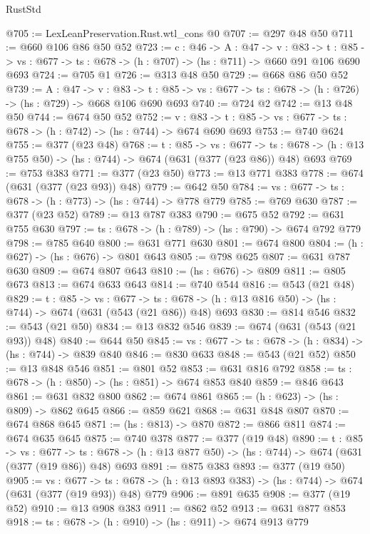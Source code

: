 \begin{lexlean}{RustStd}
\begin{coremodule}
@705 := LexLeanPreservation.Rust.wtl_cons @0
@707 := @297 @48 @50
@711 := @660 @106 @86 @50 @52
@723 := {c : @46} ->
  {A : @47} ->
  {v : @83} ->
  {t : @85} -> {vs : @677} -> {ts : @678} -> (h : @707) -> (hs : @711) -> @660 @91 @106 @690 @693
@724 := @705 @1
@726 := @313 @48 @50
@729 := @668 @86 @50 @52
@739 := {A : @47} ->
  {v : @83} ->
  {t : @85} -> {vs : @677} -> {ts : @678} -> (h : @726) -> (hs : @729) -> @668 @106 @690 @693
@740 := @724 @2
@742 := @13 @48 @50
@744 := @674 @50 @52
@752 := {v : @83} ->
  {t : @85} -> {vs : @677} -> {ts : @678} -> (h : @742) -> (hs : @744) -> @674 @690 @693
@753 := @740 @624
@755 := @377 (@23 @48)
@768 := {t : @85} ->
  {vs : @677} ->
  {ts : @678} -> (h : @13 @755 @50) -> (hs : @744) -> @674 (@631 (@377 (@23 @86)) @48) @693
@769 := @753 @383
@771 := @377 (@23 @50)
@773 := @13 @771 @383
@778 := @674 (@631 (@377 (@23 @93)) @48)
@779 := @642 @50
@784 := {vs : @677} -> {ts : @678} -> (h : @773) -> (hs : @744) -> @778 @779
@785 := @769 @630
@787 := @377 (@23 @52)
@789 := @13 @787 @383
@790 := @675 @52
@792 := @631 @755 @630
@797 := {ts : @678} -> (h : @789) -> (hs : @790) -> @674 @792 @779
@798 := @785 @640
@800 := @631 @771 @630
@801 := @674 @800
@804 := (h : @627) -> (hs : @676) -> @801 @643
@805 := @798 @625
@807 := @631 @787 @630
@809 := @674 @807 @643
@810 := (hs : @676) -> @809
@811 := @805 @673
@813 := @674 @633 @643
@814 := @740 @544
@816 := @543 (@21 @48)
@829 := {t : @85} ->
  {vs : @677} ->
  {ts : @678} -> (h : @13 @816 @50) -> (hs : @744) -> @674 (@631 (@543 (@21 @86)) @48) @693
@830 := @814 @546
@832 := @543 (@21 @50)
@834 := @13 @832 @546
@839 := @674 (@631 (@543 (@21 @93)) @48)
@840 := @644 @50
@845 := {vs : @677} -> {ts : @678} -> (h : @834) -> (hs : @744) -> @839 @840
@846 := @830 @633
@848 := @543 (@21 @52)
@850 := @13 @848 @546
@851 := @801 @52
@853 := @631 @816 @792
@858 := {ts : @678} -> (h : @850) -> (hs : @851) -> @674 @853 @840
@859 := @846 @643
@861 := @631 @832 @800
@862 := @674 @861
@865 := (h : @623) -> (hs : @809) -> @862 @645
@866 := @859 @621
@868 := @631 @848 @807
@870 := @674 @868 @645
@871 := (hs : @813) -> @870
@872 := @866 @811
@874 := @674 @635 @645
@875 := @740 @378
@877 := @377 (@19 @48)
@890 := {t : @85} ->
  {vs : @677} ->
  {ts : @678} -> (h : @13 @877 @50) -> (hs : @744) -> @674 (@631 (@377 (@19 @86)) @48) @693
@891 := @875 @383
@893 := @377 (@19 @50)
@905 := {vs : @677} ->
  {ts : @678} -> (h : @13 @893 @383) -> (hs : @744) -> @674 (@631 (@377 (@19 @93)) @48) @779
@906 := @891 @635
@908 := @377 (@19 @52)
@910 := @13 @908 @383
@911 := @862 @52
@913 := @631 @877 @853
@918 := {ts : @678} -> (h : @910) -> (hs : @911) -> @674 @913 @779

\end{coremodule}
\end{lexlean}
